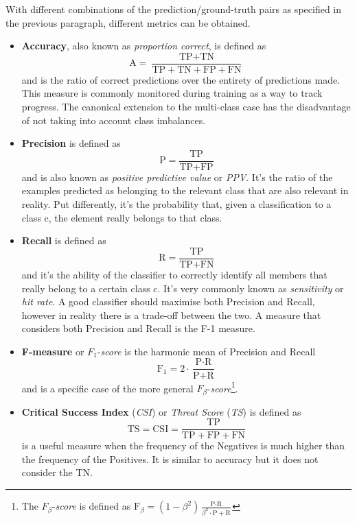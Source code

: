 With different combinations of the prediction/ground-truth pairs as specified in the previous paragraph, different metrics can be obtained.
\begin{itemize}
    \item \textbf{Accuracy}, also known as \textit{proportion correct}, is defined as 
    \begin{equation} \label{eq:accuracy}
        \text{A} = \dfrac{\text{TP}+\text{TN}}{\text{TP}+\text{TN}+\text{FP}+\text{FN}}
    \end{equation} and is the ratio of correct predictions over the entirety of predictions made. This measure is commonly monitored during training as a way to track progress. The canonical extension to the multi-class case has the disadvantage of not taking into account class imbalances.
    \item \textbf{Precision} is defined as
    \begin{equation}
        \text{P} = \dfrac{\text{TP}}{\text{TP} + \text{FP}}
    \end{equation}
    and is also known as \textit{positive predictive value} or \textit{PPV}. It's the ratio of the examples predicted as belonging to the relevant class that are also relevant in reality. Put differently, it's the probability that, given a classification to a class c, the element really belongs to that class.
    
    \item \textbf{Recall} is defined as
    \begin{equation}
        \text{R} = \dfrac{\text{TP}}{\text{TP} + \text{FN}}
    \end{equation}
    and it's the ability of the classifier to correctly identify all members that really belong to a certain class c. It's very commonly known as \textit{sensitivity} or \textit{hit rate}. A good classifier should maximise both Precision and Recall, however in reality there is a trade-off between the two. A measure that considers both Precision and Recall is the F-1 measure.
    \item \textbf{F-measure} or $F_1$-\textit{score} is the harmonic mean of Precision and Recall
    \begin{equation}
        \text{F}_1 = 2\cdot\dfrac{\text{P}\cdot\text{R}}{\text{P}+\text{R}}
    \end{equation}
    and is a specific case of the more general $F_\beta$-\textit{score}\footnote{The $F_\beta$-\textit{score} is defined as $\text{F}_\beta = (1-\beta^2)\frac{\text{P}\cdot \text{R}}{\beta^2\cdot \text{P} + \text{R}}$}.
    \item \textbf{Critical Success Index} (\textit{CSI}) or \textit{Threat Score} (\textit{TS}) is defined as 
    \begin{equation}
        \text{TS} = \text{CSI} = \dfrac{\text{TP}}{\text{TP}+\text{FP}+\text{FN}}
    \end{equation}
    is a useful measure when the frequency of the Negatives is much higher than the frequency of the Positives. It is similar to accuracy but it does not consider the TN.
\end{itemize}

